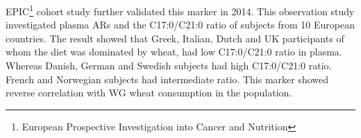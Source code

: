EPIC\footnote{European Prospective Investigation into Cancer and Nutrition} cohort study \cite{ISI:000334172400017}further validated this marker in 2014. This observation study investigated plasma ARs and the C17:0/C21:0 ratio of subjects from 10 European countries. 
The result showed that Greek, Italian, Dutch and UK participants of whom the diet was dominated by wheat, had low C17:0/C21:0 ratio in plasma. Whereas Danish, German and Swedish subjects had high C17:0/C21:0 ratio. French and Norwegian subjects had intermediate ratio. This marker showed reverse correlation with WG wheat consumption in the population.
















